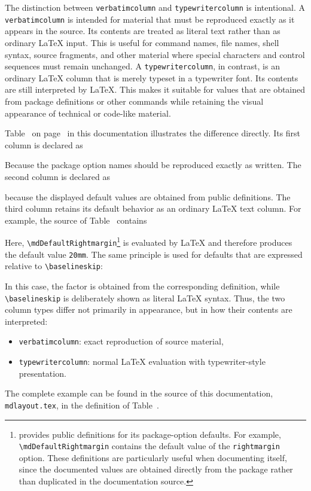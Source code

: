 \documentclass[
11pt,
a4paper,
oneside
]{scrbook}
\begin{document}
The distinction between \texttt{verbatimcolumn} and
\texttt{typewritercolumn} is intentional.
A \texttt{verbatimcolumn} is intended for material that must be
reproduced exactly as it appears in the source. Its contents are treated
as literal text rather than as ordinary \LaTeX{} input. This is useful
for command names, file names, shell syntax, source fragments, and other
material where special characters and control sequences must remain
unchanged.
A \texttt{typewritercolumn}, in contrast, is an ordinary \LaTeX{}
column that is merely typeset in a typewriter font. Its contents are
still interpreted by \LaTeX{}. This makes it suitable for values that
are obtained from package definitions or other commands while retaining
the visual appearance of technical or code-like material.

Table~ on page~
in this documentation illustrates the difference directly. 
Its first column is declared as




Because the package option names should be reproduced exactly as written.
The second column is declared as




because the displayed default values are obtained from public
\MDWordmark definitions. The third column retains its default behavior as an ordinary
\LaTeX{} text column. For example, the source of
Table~ contains




Here, \texttt{\textbackslash{}mdDefaultRightmargin}\footnote{%
	\MDWordmark provides public definitions for its package-option
	defaults. For example, \texttt{\textbackslash{}mdDefaultRightmargin}
	contains the default value of the \texttt{rightmargin} option.
	These definitions are particularly useful when documenting
	\MDWordmark itself, since the documented values are obtained
	directly from the package rather than duplicated in the
	documentation source.%
}
is evaluated by \LaTeX{} and therefore produces the default value
\texttt{20mm}.
The same principle is used for defaults that are expressed relative to
\verb|\baselineskip|:




In this case, the factor is obtained from the corresponding
\MDWordmark definition, while \verb|\baselineskip| is deliberately
shown as literal \LaTeX{} syntax.
Thus, the two column types differ not primarily in appearance, but in
how their contents are interpreted:
\begin{itemize}
	\item \texttt{verbatimcolumn}: exact reproduction of source material,
	\item \texttt{typewritercolumn}: normal \LaTeX{} evaluation with
	typewriter-style presentation.
\end{itemize}
The complete example can be found in the source of this documentation,
\texttt{mdlayout.tex}, in the definition of
Table~.
\end{document}
